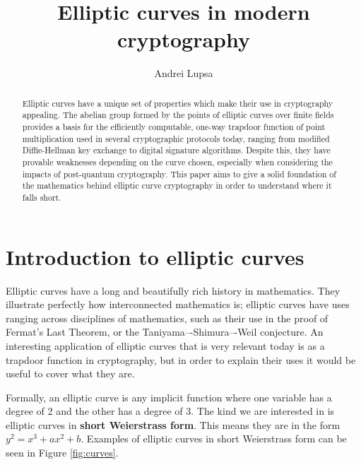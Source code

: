 \documentclass[a4paper]{article}
\title{Elliptic curves in modern cryptography}
\author{Andrei Lupsa}
\begin{document}
\maketitle

\begin{abstract}
Elliptic curves have a unique set of properties which make their use in cryptography appealing. The abelian group formed by the points of elliptic curves over finite fields provides a basis for the efficiently computable, one-way trapdoor function of point multiplication used in several cryptographic protocols today, ranging from modified Diffie-Hellman key exchange to digital signature algorithms. Despite this, they have provable weaknesses depending on the curve chosen, especially when considering the impacts of post-quantum cryptography. This paper aims to give a solid foundation of the mathematics behind elliptic curve cryptography in order to understand where it falls short.
\end{abstract}


\section{Introduction to elliptic curves}\label{intro}

Elliptic curves have a long and beautifully rich history in mathematics. They illustrate perfectly how interconnected mathematics is; elliptic curves have uses ranging across disciplines of mathematics, such as their use in the proof of Fermat's Last Theorem, or the Taniyama–-Shimura–-Weil conjecture. An interesting application of elliptic curves that is very relevant today is as a trapdoor function in cryptography, but in order to explain their uses it would be useful to cover what they are.

Formally, an elliptic curve is any implicit function where one variable has a degree of 2 and the other has a degree of 3. The kind we are interested in is elliptic curves in \textbf{short Weierstrass form}. This means they are in the form $y^2 = x^3 + ax^2 + b$. Examples of elliptic curves in short Weierstrass form can be seen in Figure \ref{fig:curves}.\cite{guide}
\end{document}
